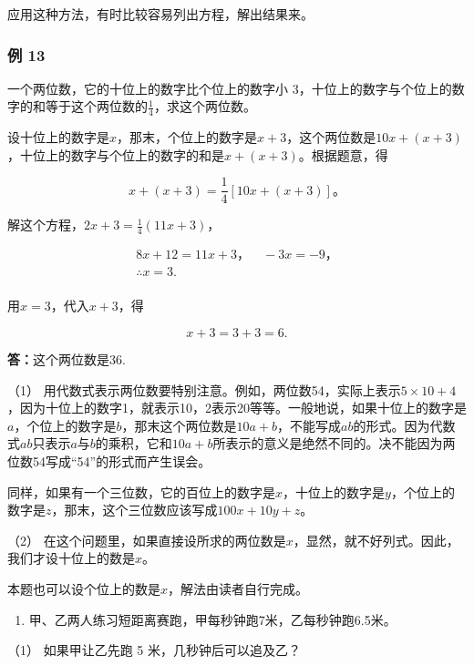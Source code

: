 应用这种方法，有时比较容易列出方程，解出结果来。

\subsubsection{例 13}

一个两位数，它的十位上的数字比个位上的数字小
3，十位上的数字与个位上的数字的和等于这个两位数的\(\frac{1}{4}\)，求这个两位数。

设十位上的数字是\(x\)，那末，个位上的数字是\(x + 3\)，这个两位数是\(10x + (x + 3)\)，十位上的数字与个位上的数字的和是\(x + (x + 3)\)。根据题意，得

\[
x + (x + 3) = \frac{1}{4} [ 10 x + (x + 3) ]\text{。}
\]

解这个方程，\(2x+3=\frac{1}{4}(11x+3)\)，

\[
\begin{array}{l} 8 x + 12 = 11 x + 3\text{，} \quad - 3 x = - 9\text{，} \\ \therefore x = 3. \\ \end{array}
\]

用\(x = 3\)，代入\(x + 3\)，得

\[
x + 3 = 3 + 3 = 6.
\]

\textbf{答：}这个两位数是36.


（1）
用代数式表示两位数要特别注意。例如，两位数54，实际上表示\(5 \times 10 + 4\)，因为十位上的数字1，就表示10，2表示20等等。一般地说，如果十位上的数字是\(a\)，个位上的数字是\(b\)，那末这个两位数是\(10a + b\)，不能写成\(ab\)的形式。因为代数式\(ab\)只表示\(a\)与\(b\)的乘积，它和\(10a + b\)所表示的意义是绝然不同的。决不能因为两位数54写成``54''的形式而产生误会。

同样，如果有一个三位数，它的百位上的数字是\(x\)，十位上的数字是\(y\)，个位上的数字是\(z\)，那末，这个三位数应该写成\(100x + 10y + z\)。

（2）
在这个问题里，如果直接设所求的两位数是\(x\)，显然，就不好列式。因此，我们才设十位上的数是\(x\)。

本题也可以设个位上的数是\(x\)，解法由读者自行完成。

\begin{enumerate}
\item
  甲、乙两人练习短距离赛跑，甲每秒钟跑7米，乙每秒钟跑6.5米。
\end{enumerate}

（1） 如果甲让乙先跑 5 米，几秒钟后可以追及乙？

